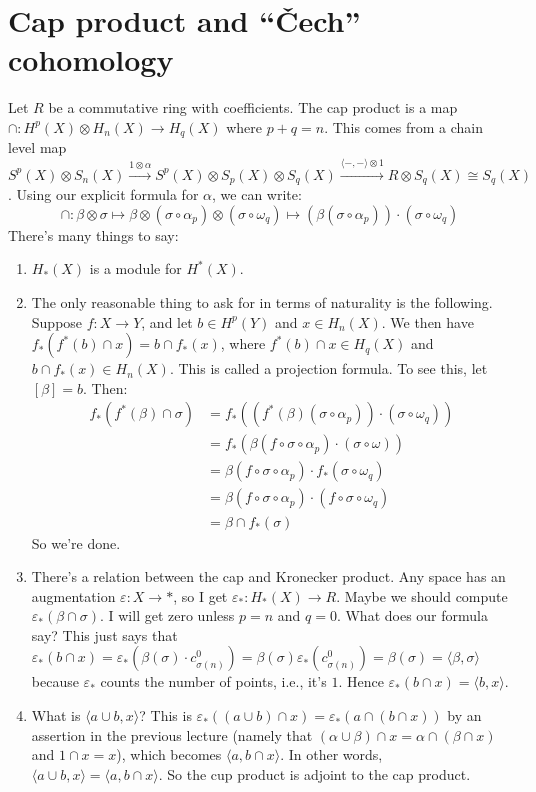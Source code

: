 \documentclass{amsart}
\theoremstyle{theorem}
\theoremstyle{definition}
\begin{document}
\section{Cap product and ``\v{C}ech'' cohomology}
Let $R$ be a commutative ring with coefficients. The cap product is a map $\cap: H^p(X)\otimes H_n(X)\to H_{q}(X)$ where $p+q=n$. This comes from a chain level map $S^p(X)\otimes S_n(X)\xrightarrow{1\otimes\alpha} S^p(X)\otimes S_p(X)\otimes S_q(X)\xrightarrow{\langle-,-\rangle\otimes 1}R\otimes S_q(X)\cong S_q(X)$. Using our explicit formula for $\alpha$, we can write:
\begin{equation*}
\cap:\beta\otimes\sigma\mapsto\beta\otimes(\sigma\circ\alpha_p)\otimes(\sigma\circ\omega_q)\mapsto\left(\beta(\sigma\circ\alpha_p)\right)\cdot (\sigma\circ\omega_q)
\end{equation*}
There's many things to say:
\begin{enumerate}
\item $ H_\ast(X)$ is a module for $ H^\ast(X)$.
\item The only reasonable thing to ask for in terms of naturality is the following. Suppose $f:X\to Y$, and let $b\in H^p(Y)$ and $x\in H_n(X)$. We then have $f_\ast(f^\ast(b)\cap x)=b\cap f_\ast(x)$, where $f^\ast(b)\cap x\in H_q(X)$ and $b\cap f_\ast(x)\in H_n(X)$. This is called a projection formula. To see this, let $[\beta]=b$. Then:
\begin{align*}
f_\ast(f^\ast(\beta)\cap\sigma)& =f_\ast(\left(f^\ast(\beta)(\sigma\circ\alpha_p)\right)\cdot(\sigma\circ\omega_q))\\
& =f_\ast(\beta(f\circ\sigma\circ\alpha_p)\cdot(\sigma\circ\omega))\\
& =\beta(f\circ\sigma\circ\alpha_p)\cdot f_\ast(\sigma\circ\omega_q)\\
& = \beta(f\circ\sigma\circ\alpha_p)\cdot(f\circ\sigma\circ\omega_q)\\
& = \beta\cap f_\ast(\sigma)
\end{align*}
So we're done.
\item There's a relation between the cap and Kronecker product. Any space has an augmentation $\varepsilon:X\to\ast$, so I get $\varepsilon_\ast: H_\ast(X)\to R$. Maybe we should compute $\varepsilon_\ast(\beta\cap \sigma)$. I will get zero unless $p=n$ and $q=0$. What does our formula say? This just says that $\varepsilon_\ast(b\cap x)=\varepsilon_\ast(\beta(\sigma)\cdot c^0_{\sigma(n)})=\beta(\sigma)\varepsilon_\ast(c^0_{\sigma(n)})=\beta(\sigma)=\langle \beta,\sigma\rangle$ because $\varepsilon_\ast$ counts the number of points, i.e., it's $1$. Hence $\varepsilon_\ast(b\cap x)=\langle b,x\rangle$.
\item What is $\langle a\cup b,x\rangle$? This is $\varepsilon_\ast((a\cup b)\cap x)=\varepsilon_\ast(a\cap(b\cap x))$ by an assertion in the previous lecture (namely that $(\alpha\cup\beta)\cap x=\alpha\cap(\beta\cap x)$ and $1\cap x=x$), which becomes $\langle a,b\cap x\rangle$. In other words, $\langle a\cup b,x\rangle=\langle a,b\cap x\rangle$. So the cup product is adjoint to the cap product.
\end{enumerate}
\end{document}
